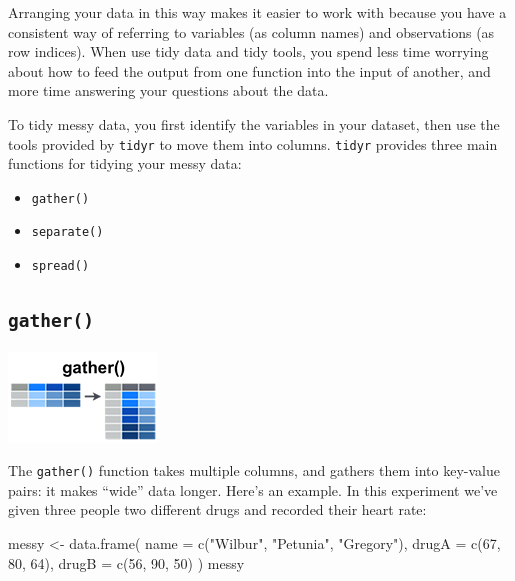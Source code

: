 \documentclass[
]{book}
\newenvironment{Shaded}{\begin{snugshade}}{\end{snugshade}}
\newcommand{\AttributeTok}[1]{\textcolor[rgb]{0.77,0.63,0.00}{#1}}
\newcommand{\DecValTok}[1]{\textcolor[rgb]{0.00,0.00,0.81}{#1}}
\newcommand{\FunctionTok}[1]{\textcolor[rgb]{0.00,0.00,0.00}{#1}}
\newcommand{\NormalTok}[1]{#1}
\newcommand{\OtherTok}[1]{\textcolor[rgb]{0.56,0.35,0.01}{#1}}
\newcommand{\StringTok}[1]{\textcolor[rgb]{0.31,0.60,0.02}{#1}}
\providecommand{\tightlist}{%
  \setlength{\itemsep}{0pt}\setlength{\parskip}{0pt}}
\begin{document}
Arranging your data in this way makes it easier to work with because you have a consistent way of referring to variables (as column names) and observations (as row indices). When use tidy data and tidy tools, you spend less time worrying about how to feed the output from one function into the input of another, and more time answering your questions about the data.

To tidy messy data, you first identify the variables in your dataset, then use the tools provided by \texttt{tidyr} to move them into columns. \texttt{tidyr} provides three main functions for tidying your messy data:

\begin{itemize}
\tightlist
\item
  \texttt{gather()}
\item
  \texttt{separate()}
\item
  \texttt{spread()}
\end{itemize}

\hypertarget{gather}{%
\subsection*{\texorpdfstring{\texttt{gather()}}{gather()}}\label{gather}}

\includegraphics{./figures/tidyr-gather.png}

The \texttt{gather()} function takes multiple columns, and gathers them into key-value pairs: it makes ``wide'' data longer. Here's an example. In this experiment we've given three people two different drugs and recorded their heart rate:

\begin{Shaded}
\begin{Highlighting}[]
\NormalTok{messy }\OtherTok{\textless{}{-}} \FunctionTok{data.frame}\NormalTok{(}
  \AttributeTok{name =} \FunctionTok{c}\NormalTok{(}\StringTok{"Wilbur"}\NormalTok{, }\StringTok{"Petunia"}\NormalTok{, }\StringTok{"Gregory"}\NormalTok{),}
  \AttributeTok{drugA =} \FunctionTok{c}\NormalTok{(}\DecValTok{67}\NormalTok{, }\DecValTok{80}\NormalTok{, }\DecValTok{64}\NormalTok{),}
  \AttributeTok{drugB =} \FunctionTok{c}\NormalTok{(}\DecValTok{56}\NormalTok{, }\DecValTok{90}\NormalTok{, }\DecValTok{50}\NormalTok{)}
\NormalTok{)}
\NormalTok{messy}
\end{Highlighting}
\end{Shaded}
\end{document}
